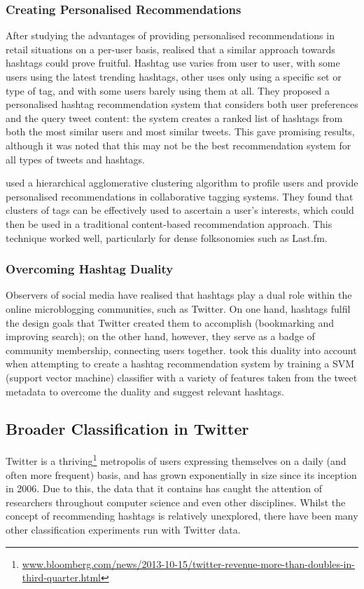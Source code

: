 \documentclass[12pt,a4paper]{article}
\begin{document}
\subsubsection{Creating Personalised Recommendations}
After studying the advantages of providing personalised recommendations in retail situations on a per-user basis, \textcite{Kywe:2012} realised that a similar approach towards hashtags could prove fruitful. Hashtag use varies from user to user, with some users using the latest trending hashtags, other uses only using a specific set or type of tag, and with some users barely using them at all. They proposed a personalised hashtag recommendation system that considers both user preferences and the query tweet content: the system creates a ranked list of hashtags from both the most similar users and most similar tweets. This gave promising results, although it was noted that this may not be the best recommendation system for all types of tweets and hashtags.

\textcite{Shepitsen:2008} used a hierarchical agglomerative clustering algorithm to profile users and provide personalised recommendations in collaborative tagging systems. They found that clusters of tags can be effectively used to ascertain a user's interests, which could then be used in a traditional content-based recommendation approach. This technique worked well, particularly for dense folksonomies such as Last.fm.

\subsubsection{Overcoming Hashtag Duality}
Observers of social media have realised that hashtags play a dual role within the online microblogging communities, such as Twitter. On one hand, hashtags fulfil the design goals that Twitter created them to accomplish (bookmarking and improving search); on the other hand, however, they serve as a badge of community membership, connecting users together. \textcite{Yang:2012} took this duality into account when attempting to create a hashtag recommendation system by training a SVM (support vector machine) classifier with a variety of features taken from the tweet metadata to overcome the duality and suggest relevant hashtags.

\subsection{Broader Classification in Twitter}
Twitter is a thriving\footnote{\url{www.bloomberg.com/news/2013-10-15/twitter-revenue-more-than-doubles-in-third-quarter.html}} metropolis of users expressing themselves on a daily (and often more frequent) basis, and has grown exponentially in size since its inception in 2006. Due to this, the data that it contains has caught the attention of researchers throughout computer science and even other disciplines. Whilst the concept of recommending hashtags is relatively unexplored, there have been many other classification experiments run with Twitter data.
\end{document}
